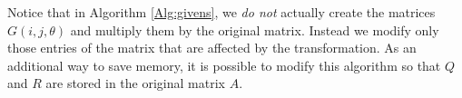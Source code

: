 Notice that in Algorithm \ref{Alg:givens}, we \emph{do not} actually create the matrices $G(i,j,\theta)$ and multiply them by the original matrix.
Instead we modify only those entries of the matrix that are affected by the transformation. As an additional way to save memory, it is possible to modify this algorithm so that $Q$ and $R$ are stored in the original matrix $A$.


